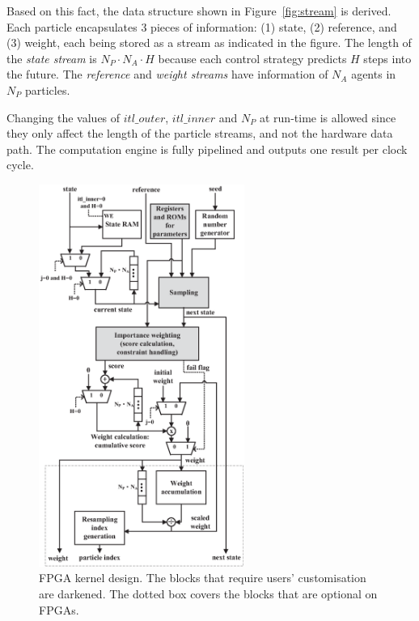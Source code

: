 Based on this fact, the data structure shown in Figure~\ref{fig:stream} is derived.
Each particle encapsulates 3 pieces of information: (1) state, (2) reference, and (3) weight, each being stored as a stream as indicated in the figure.
The length of the \textit{state stream} is $N_P \cdot N_A \cdot H$ because each control strategy predicts $H$ steps into the future.
The \textit{reference} and \textit{weight streams} have information of $N_A$ agents in $N_P$ particles.

Changing the values of $itl\_outer$, $itl\_inner$ and $N_P$ at run-time is allowed since they only affect the length of the particle streams, and not the hardware data path.
The computation engine is fully pipelined and outputs one result per clock cycle.

\begin{figure}[t!]
\begin{center}
\includegraphics[width=0.6\textwidth]{design_flow/figures/kernel}
\end{center}
\caption{FPGA kernel design. The blocks that require users' customisation are darkened. The dotted box covers the blocks that are optional on FPGAs.}
\label{fig:kernel}
\end{figure}


